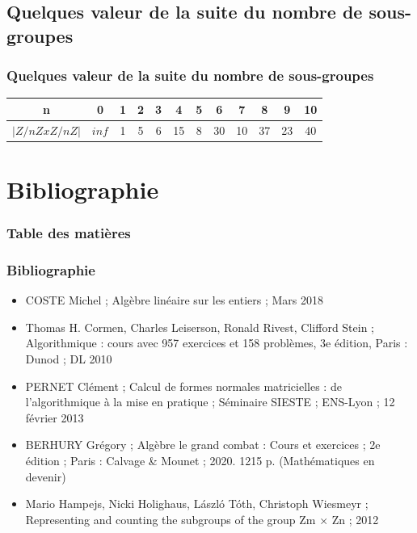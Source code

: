 \documentclass{beamer}
\begin{document}
\subsection{Quelques valeur de la suite du nombre de sous-groupes}
\begin{frame}
\frametitle{Quelques valeur de la suite du nombre de sous-groupes}
\begin{center}
    \begin{tabular}{|c|c|c|c|c|c|c|c|c|c|c|c|}
        \hline
        n       & 0     & 1 & 2 & 3 & 4  & 5 & 6  & 7  & 8  & 9  & 10 \tabularnewline
        \hline
        $| Z/nZxZ/nZ |$ & $inf$ & 1 & 5 & 6 & 15 & 8 & 30 & 10 & 37 & 23 & 40 \tabularnewline
        \hline
    \end{tabular}
\end{center}
\end{frame}


\section{Bibliographie}
\begin{frame}
\frametitle{Table des matières}
\tableofcontents[currentsection]
\end{frame}


\begin{frame}
\frametitle{Bibliographie}
\begin{itemize}
    \item COSTE Michel ; Algèbre linéaire sur les entiers ; Mars 2018
    \item Thomas H. Cormen, Charles Leiserson, Ronald Rivest, Clifford Stein ; Algorithmique : cours avec 957 exercices et 158 problèmes, 3e édition, Paris : Dunod ; DL 2010
    \item PERNET Clément ; Calcul de formes normales matricielles : de l’algorithmique à la mise en pratique ; Séminaire SIESTE ; ENS-Lyon ; 12 février 2013
    \item BERHURY Grégory ; Algèbre le grand combat : Cours et exercices ; 2e édition ; Paris : Calvage & Mounet ; 2020. 1215 p. (Mathématiques en devenir)
    \item Mario Hampejs, Nicki Holighaus, László Tóth, Christoph Wiesmeyr ; Representing and counting the subgroups of the group Zm × Zn ; 2012
\end{itemize}
\end{frame}
\end{document}
